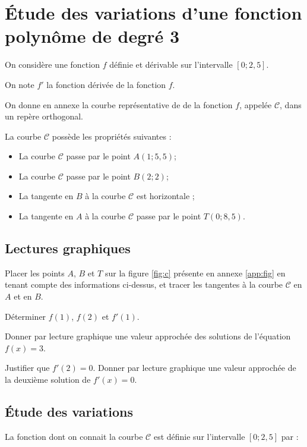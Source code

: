 \section{\'Etude des variations d'une fonction polynôme de degré 3}\label{ex:deg3}

On considère une fonction $f$ définie et dérivable sur l'intervalle $[0 ; 2,5]$.

On note $f'$ la fonction dérivée de la fonction $f$. 

On donne en annexe la courbe représentative de de la fonction $f$, appelée $\mathcal{C}$, dans un repère orthogonal.

La courbe $\mathcal{C}$ possède les propriétés suivantes :
\begin{itemize}
	\item La courbe $\mathcal{C}$ passe par le point $A (1 ; 5,5)$;
	\item La courbe $\mathcal{C}$ passe par le point $B (2 ; 2)$;
	\item La tangente en $B$ à la courbe $\mathcal{C}$ est horizontale ;
	\item La tangente en $A$ à la courbe $\mathcal{C}$ passe par le point $T (0; 8,5)$.
\end{itemize}

\subsection{Lectures graphiques}

\begin{questions}
	\question[2] Placer les points $A$, $B$ et $T$ sur la figure \ref{fig:c} présente en annexe \ref{app:fig} en tenant compte des informations ci-dessus, et tracer les tangentes à la courbe $\mathcal{C}$ en $A$ et en $B$.
	
	\question[2] Déterminer $f(1)$, $f(2)$ et $f'(1)$.
	
	\question[1] Donner par lecture graphique une valeur approchée des solutions de l'équation $f(x) = 3$.
	
	\question[2] Justifier que $f'(2) = 0$. Donner par lecture graphique une valeur approchée de la deuxième solution de $f'(x) = 0$.
\end{questions}

\subsection{\'Etude des variations}

La fonction dont on connait la courbe $\mathcal{C}$ est définie sur l'intervalle $[0 ; 2,5]$ par :

